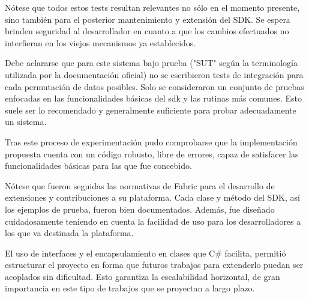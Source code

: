N\'otese que todos estos tests resultan relevantes no s\'olo en el momento presente, sino tambi\'en para el posterior mantenimiento y extensi\'on del SDK. Se espera brinden seguridad al desarrollador en cuanto a que los cambios efectuados no interfieran en los viejos mecanismos ya establecidos.






Debe aclararse que para este sistema bajo prueba ("SUT" seg\'un la terminolog\'ia utilizada por la documentaci\'on oficial) no se escribieron tests de integración para cada permutación de datos posibles. Solo se consideraron un conjunto de pruebas enfocadas en las funcionalidades b\'asicas del sdk y las rutinas m\'as comunes. Esto suele ser lo recomendado y generalmente suficiente para probar adecuadamente un sistema. 


Tras este proceso de experimentaci\'on pudo comprobarse que la implementaci\'on propuesta cuenta con un c\'odigo robusto, libre de errores, capaz de satisfacer las funcionalidades b\'asicas para las que fue concebido.

N\'otese que fueron seguidas las normativas de Fabric para el desarrollo de extensiones y contribuciones a su plataforma. Cada clase y m\'etodo del SDK, as\'i los ejemplos de prueba, fueron bien documentados. Adem\'as, fue dise\~nado cuidadosamente teniendo en cuenta la facilidad de uso para los desarrolladores a los que va destinada la plataforma.

El uso de interfaces y el encapsulamiento en clases que C\# facilita, permiti\'o estructurar el proyecto en forma que futuros trabajos para extenderlo puedan ser acoplados sin dificultad. Esto garantiza la escalabilidad horizontal, de gran importancia en este tipo de trabajos que se proyectan a largo plazo. 
